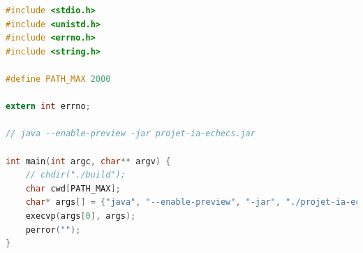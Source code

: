 \documentclass{article}
\begin{document}
\begin{appendices}
\begin{lstlisting}[language=java, caption={Le corps de la partie qui traiter les entrées/sorties.},label={lst:io}]
\end{lstlisting}

\begin{lstlisting}[language=c, caption={Ce programme en C permet de lancer le fichier .jar par sa version compilée sur un système Linux.}, label={lst:launcher}]
#include <stdio.h>
#include <unistd.h>
#include <errno.h>
#include <string.h>

#define PATH_MAX 2000

extern int errno;

// java --enable-preview -jar projet-ia-echecs.jar 

int main(int argc, char** argv) {
    // chdir("./build");
    char cwd[PATH_MAX];
    char* args[] = {"java", "--enable-preview", "-jar", "./projet-ia-echecs.jar", NULL};
    execvp(args[0], args);
    perror("");
}
\end{lstlisting}

\end{appendices}
\end{document}

